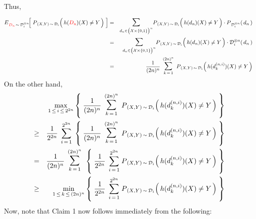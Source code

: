 Thus,
\begin{eqnarray*}
\overset{{\color{white}\vert}}{E}_{{\color{red}D_{n}}\,\sim\,\mathcal{D}_{i}^{\otimes n}}\!\!\left[\;
	P_{\,(X,Y)\,\sim\,\mathcal{D}_{i}}\!\left(\,h({\color{red}D_{n}})(X) \overset{{\color{white}.}}{\neq} Y\,\right)
	\;\right]
& = &
	\underset{d_{n}\in\left(\mathcal{X}\overset{{\color{white}.}}{\times}\{0,1\}\right)^{n}}{\textnormal{\Large$\sum$}}
	P_{\,(X,Y)\,\sim\,\mathcal{D}_{i}}\!\left(\,h(d_{n})(X) \overset{{\color{white}.}}{\neq} Y\,\right)
	\cdot
	P_{\,\mathcal{D}_{i}^{\otimes n}}(\,d_{n}\,)
\\
& = &
	\underset{d_{n}\in\left(\mathcal{X}\overset{{\color{white}.}}{\times}\{0,1\}\right)^{n}}{\textnormal{\Large$\sum$}}
	P_{\,(X,Y)\,\sim\,\mathcal{D}_{i}}\!\left(\,h(d_{n})(X) \overset{{\color{white}.}}{\neq} Y\,\right)
	\cdot
	\mathcal{D}_{i}^{\otimes n}\!\left(\,d_{n}\,\right)
\\
& = &
	\dfrac{1}{(2n)^{n}}\;\,
	\overset{(2n)^{n}}{\underset{k\,=\,1}{\textnormal{\Large$\sum$}}}\;\,
	P_{\,(X,Y)\,\sim\,\mathcal{D}_{i}}\!\left(\,h(d^{(n,i)}_{k})(X) \overset{{\color{white}.}}{\neq} Y\,\right)
\end{eqnarray*}
On the other hand,
\begin{eqnarray*}
&&
\underset{1\,\leq\, i \,\leq\, 2^{2n}}{\max}\left\{\;
	\dfrac{1}{(2n)^{n}}\;\,
	\overset{(2n)^{n}}{\underset{k\,=\,1}{\textnormal{\Large$\sum$}}}\;\,
	P_{\,(X,Y)\,\sim\,\mathcal{D}_{i}}\!\left(\,h(d^{(n,i)}_{k})(X) \overset{{\color{white}.}}{\neq} Y\,\right)
	\;\right\}
\\
& \geq &
	\dfrac{1}{2^{2n}}\;\,
	\overset{2^{2n}}{\underset{i\,=\,1}{\sum}}\;\left\{\;
		\dfrac{1}{(2n)^{n}}\;\,
		\overset{(2n)^{n}}{\underset{k\,=\,1}{\textnormal{\Large$\sum$}}}\;\,
		P_{\,(X,Y)\,\sim\,\mathcal{D}_{i}}\!\left(\,h(d^{(n,i)}_{k})(X) \overset{{\color{white}.}}{\neq} Y\,\right)
		\;\right\}
\\
& = &
	\dfrac{1}{(2n)^{n}}\;\,
	\overset{(2n)^{n}}{\underset{k\,=\,1}{\textnormal{\Large$\sum$}}}\;\,\left\{\;
		\dfrac{1}{2^{2n}}\;\,
		\overset{2^{2n}}{\underset{i\,=\,1}{\sum}}\;
		P_{\,(X,Y)\,\sim\,\mathcal{D}_{i}}\!\left(\,h(d^{(n,i)}_{k})(X) \overset{{\color{white}.}}{\neq} Y\,\right)
		\;\right\}
\\
& \geq &
\underset{1\,\leq\, k \,\leq\, (2n)^{n}}{\min}\left\{\;
	\dfrac{1}{2^{2n}}\;\,
	\overset{2^{2n}}{\underset{i\,=\,1}{\sum}}\;
	P_{\,(X,Y)\,\sim\,\mathcal{D}_{i}}\!\left(\,h(d^{(n,i)}_{k})(X) \overset{{\color{white}.}}{\neq} Y\,\right)
	\;\right\}
\end{eqnarray*}
Now, note that Claim 1 now follows immediately from the following:

